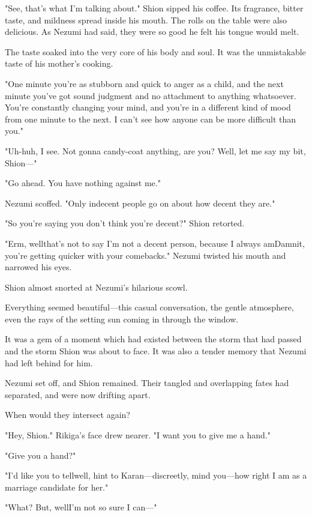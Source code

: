 "See, that's what I'm talking about." Shion sipped his coffee. Its
fragrance, bitter taste, and mildness spread inside his mouth. The rolls
on the table were also delicious. As Nezumi had said, they were so good
he felt his tongue would melt.

The taste soaked into the very core of his body and soul. It was the
unmistakable taste of his mother's cooking.

"One minute you're as stubborn and quick to anger as a child, and the
next minute you've got sound judgment and no attachment to anything
whatsoever. You're constantly changing your mind, and you're in a
different kind of mood from one minute to the next. I can't see how
anyone can be more difficult than you."

"Uh-huh, I see. Not gonna candy-coat anything, are you? Well, let me say
my bit, Shion---"

"Go ahead. You have nothing against me."

Nezumi scoffed. "Only indecent people go on about how decent they are."

"So you're saying you don't think you're decent?" Shion retorted.

"Erm, well\el that's not to say I'm not a decent person, because I
always am\el Damnit, you're getting quicker with your comebacks."
Nezumi twisted his mouth and narrowed his eyes.

Shion almost snorted at Nezumi's hilarious scowl.

Everything seemed beautiful---this casual conversation, the gentle
atmosphere, even the rays of the setting sun coming in through the
window.

It was a gem of a moment which had existed between the storm that had
passed and the storm Shion was about to face. It was also a tender
memory that Nezumi had left behind for him.

\myspace

Nezumi set off, and Shion remained. Their tangled and overlapping fates
had separated, and were now drifting apart.

When would they intersect again?

"Hey, Shion." Rikiga's face drew nearer. "I want you to give me a hand."

"Give you a hand?"

"I'd like you to tell\el well, hint to Karan---discreetly, mind
you---how right I am as a marriage candidate for her."

"What? But, well\el I'm not so sure I can---"

